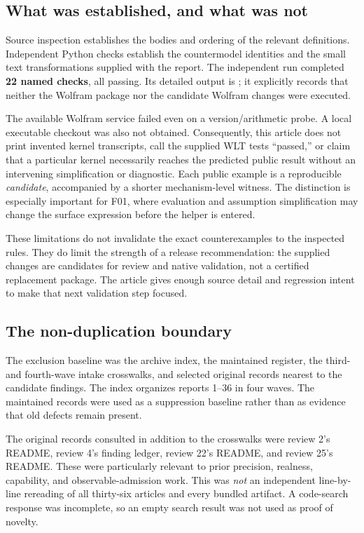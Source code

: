 \documentclass[11pt,letterpaper]{article}
\newcommand{\code}[1]{\texttt{\detokenize{#1}}}
\begin{document}
\subsection{What was established, and what was not}

Source inspection establishes the bodies and ordering of the relevant definitions. Independent Python checks establish the countermodel identities and the small text transformations supplied with the report. The independent run completed \textbf{22 named checks}, all passing. Its detailed output is ; it explicitly records that neither the Wolfram package nor the candidate Wolfram changes were executed.

The available Wolfram service failed even on a version/arithmetic probe. A local executable checkout was also not obtained. Consequently, this article does not print invented kernel transcripts, call the supplied WLT tests ``passed,'' or claim that a particular kernel necessarily reaches the predicted public result without an intervening simplification or diagnostic. Each public example is a reproducible \emph{candidate}, accompanied by a shorter mechanism-level witness. The distinction is especially important for F01, where evaluation and assumption simplification may change the surface expression before the helper is entered.

These limitations do not invalidate the exact counterexamples to the inspected rules. They do limit the strength of a release recommendation: the supplied changes are candidates for review and native validation, not a certified replacement package. The article gives enough source detail and regression intent to make that next validation step focused.

\subsection{The non-duplication boundary}

The exclusion baseline was the archive index, the maintained \code{CODE_REVIEW_STATUS.md} register, the third- and fourth-wave intake crosswalks, and selected original records nearest to the candidate findings. The index organizes reports 1--36 in four waves. The maintained records were used as a suppression baseline rather than as evidence that old defects remain present.\cite{archive,register,wave3,wave4}

The original records consulted in addition to the crosswalks were review 2's README, review 4's finding ledger, review 22's README, and review 25's README. These were particularly relevant to prior precision, realness, capability, and observable-admission work.\cite{review2,review4,review22,review25} This was \emph{not} an independent line-by-line rereading of all thirty-six articles and every bundled artifact. A code-search response was incomplete, so an empty search result was not used as proof of novelty.
\end{document}
